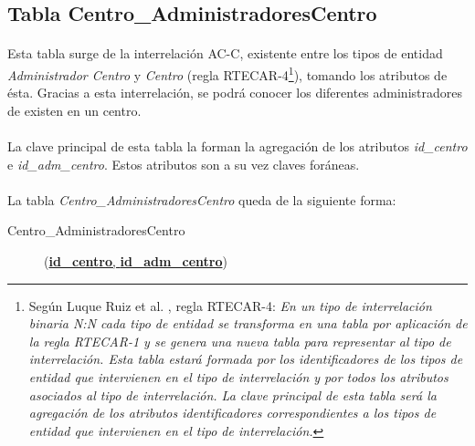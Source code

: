    \subsection{Tabla Centro\_AdministradoresCentro}

      \paragraph{}Esta tabla surge de la interrelación AC-C, existente entre
      los tipos de entidad \textit{Administrador Centro} y \textit{Centro}
      (regla RTECAR-4\footnote{Según Luque Ruiz et al. \cite{luqueRuiz}, regla
      RTECAR-4: \textit{En un tipo de
      interrelación binaria N:N cada tipo de entidad se transforma en una tabla
      por aplicación de la regla RTECAR-1 y se genera una nueva tabla para
      representar al tipo de interrelación. Esta tabla estará formada por los
      identificadores de los tipos de entidad que intervienen en el tipo
      de interrelación y por todos los atributos asociados al tipo de
      interrelación. La clave principal de esta tabla será la agregación de los
      atributos identificadores correspondientes a los tipos de entidad que
      intervienen en el tipo de interrelación.}}), tomando los atributos de
      ésta. Gracias a esta interrelación, se podrá conocer los diferentes
      administradores de existen en un centro.

      \paragraph{}La clave principal de esta tabla la forman la agregación de
      los atributos \textit{id\_centro} e \textit{id\_adm\_centro}. Estos
      atributos son a su vez claves foráneas.

      \paragraph{}La tabla \textit{Centro\_AdministradoresCentro} queda de la
      siguiente forma:

      \begin{description}
         \item[Centro\_AdministradoresCentro] \begin{flushleft}(\underline{\textbf{id\_centro},
         \textbf{id\_adm\_centro}})\end{flushleft}
      \end{description}